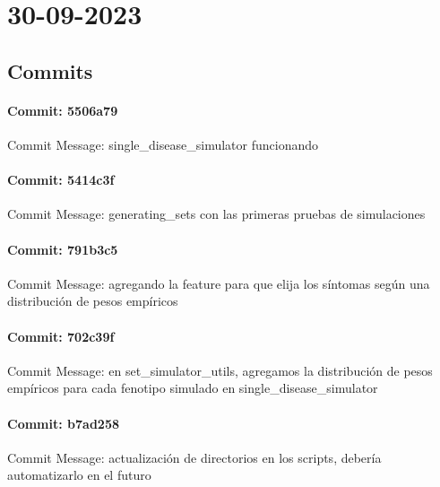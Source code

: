 \documentclass{article}
\begin{document}
\section{30-09-2023}
\subsection{Commits}
\paragraph{Commit: 5506a79}
Commit Message: single_disease_simulator funcionando

\paragraph{Commit: 5414c3f}
Commit Message: generating_sets con las primeras pruebas de simulaciones

\paragraph{Commit: 791b3c5}
Commit Message: agregando la feature para que elija los síntomas según una distribución de pesos empíricos

\paragraph{Commit: 702c39f}
Commit Message: en set_simulator_utils, agregamos la distribución de pesos empíricos para cada fenotipo simulado en single_disease_simulator

\paragraph{Commit: b7ad258}
Commit Message: actualización de directorios en los scripts, debería automatizarlo en el futuro

\end{document}
